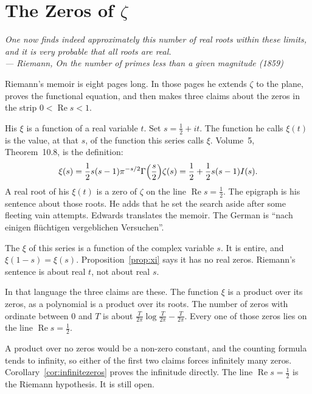 \chapter{The Zeros of \texorpdfstring{$\zeta$}{zeta}}\label{ch:zeros}

\begin{center}\itshape
One now finds indeed approximately this number of real roots within these limits, and it is very probable that all roots are real.\\
\upshape --- Riemann, \emph{On the number of primes less than a given magnitude} (1859)
\end{center}

Riemann's memoir is eight pages long. In those pages he extends $\zeta$ to the plane, proves the functional equation, and then makes three claims about the zeros in the strip $0<\operatorname{Re}s<1$.


His $\xi$ is a function of a real variable $t$. Set $s=\frac12+it$. The function he calls $\xi(t)$ is the value, at that $s$, of the function this series calls $\xi$. Volume~5, Theorem~10.8, is the definition:
\[
\xi(s)=\frac12 s(s-1)\pi^{-s/2}\Gamma\Bigl(\frac s2\Bigr)\zeta(s)=\frac12+\frac12 s(s-1)I(s).
\]
A real root of his $\xi(t)$ is a zero of $\zeta$ on the line $\operatorname{Re}s=\frac12$. The epigraph is his sentence about those roots. He adds that he set the search aside after some fleeting vain attempts. Edwards translates the memoir. The German is ``nach einigen fl\"uchtigen vergeblichen Versuchen''.

The $\xi$ of this series is a function of the complex variable $s$. It is entire, and $\xi(1-s)=\xi(s)$. Proposition~\ref{prop:xi} says it has no real zeros. Riemann's sentence is about real $t$, not about real $s$.

In that language the three claims are these. The function $\xi$ is a product over its zeros, as a polynomial is a product over its roots. The number of zeros with ordinate between $0$ and $T$ is about $\frac T{2\pi}\log\frac T{2\pi}-\frac T{2\pi}$. Every one of those zeros lies on the line $\operatorname{Re}s=\frac12$.

A product over no zeros would be a non-zero constant, and the counting formula tends to infinity, so either of the first two claims forces infinitely many zeros. Corollary~\ref{cor:infinitezeros} proves the infinitude directly. The line $\operatorname{Re}s=\frac12$ is the Riemann hypothesis. It is still open.

